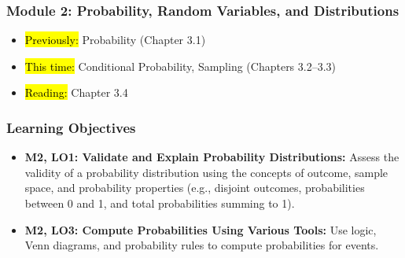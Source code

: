 
\begin{frame}
    \frametitle{Module 2: Probability, Random Variables, and Distributions}
    \begin{itemize}
        \item \hl{Previously: }Probability (Chapter 3.1)
        \item \hl{This time: }Conditional Probability, Sampling (Chapters 3.2--3.3)
        \item \hl{Reading: }Chapter 3.4
    \end{itemize}

\end{frame}
\begin{frame}
    \frametitle{Learning Objectives}
    \begin{itemize}
        \item \textbf{M2, LO1: Validate and Explain Probability Distributions:} Assess the validity of a probability distribution using the concepts of outcome, sample space, and probability properties (e.g., disjoint outcomes, probabilities between 0 and 1, and total probabilities summing to 1).
        \item \textbf{M2, LO3: Compute Probabilities Using Various Tools:} Use logic, Venn diagrams, and probability rules to compute probabilities for events.
    \end{itemize}
\end{frame}
